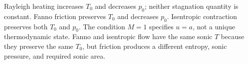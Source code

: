Rayleigh heating increases $T_0$ and decreases $p_0$; neither stagnation quantity is constant.
Fanno friction preserves $T_0$ and decreases $p_0$.
Isentropic contraction preserves both $T_0$ and $p_0$.
The condition $M=1$ specifies $u=a$, not a unique thermodynamic state.
Fanno and isentropic flow have the same sonic $T$ because they preserve the same $T_0$,
but friction produces a different entropy, sonic pressure, and required sonic area.
